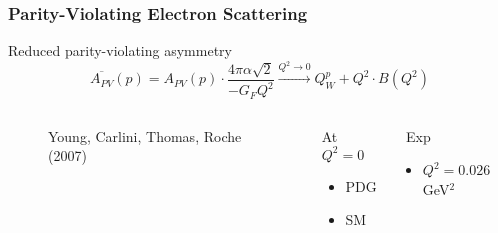 \begin{frame}
 \frametitle{Parity-Violating Electron Scattering}
 \begin{block}{Reduced parity-violating asymmetry}
  \begin{equation*}
   \overline{A_{PV}}(p) = A_{PV}(p) \cdot \frac{4 \pi \alpha \sqrt{2}}{-G_F Q^2} \xrightarrow{Q^2 \to 0} Q^p_W + Q^2 \cdot B(Q^2)
  \end{equation*}
 \end{block}
 \begin{columns}[T]
   \begin{figure}
    \centerline{}
    \caption{Young, Carlini, Thomas, Roche (2007)}
   \end{figure}
   \begin{block}{At $Q^2 = 0$}
    \begin{itemize}
     \item \textcolor{PDGred}{PDG}
     \item SM
    \end{itemize}
   \end{block}
   \begin{block}{\Qweak\ Exp}
    \begin{itemize}
     \item $Q^2 = 0.026$\,GeV$^2$
    \end{itemize}
   \end{block}
 \end{columns}
\end{frame}
